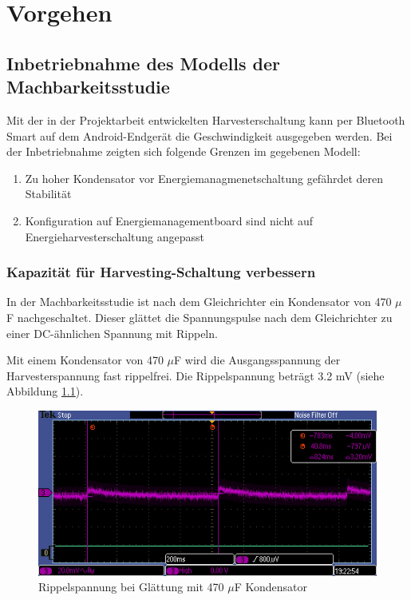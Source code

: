 \chapter{Vorgehen}

\section{Inbetriebnahme des Modells der Machbarkeitsstudie}
Mit der in der Projektarbeit entwickelten Harvesterschaltung kann per Bluetooth Smart auf dem Android-Endgerät die Geschwindigkeit ausgegeben werden.
Bei der Inbetriebnahme zeigten sich folgende Grenzen im gegebenen Modell:

\begin{enumerate}
    \item Zu hoher Kondensator vor Energiemanagmenetschaltung gefährdet deren Stabilität
    \item Konfiguration auf Energiemanagementboard sind nicht auf Energieharvesterschaltung angepasst
\end{enumerate}


\subsection{Kapazität für Harvesting-Schaltung verbessern}

In der Machbarkeitsstudie ist nach dem Gleichrichter ein Kondensator von 470 $\mu$F nachgeschaltet. Dieser glättet die Spannungspulse nach dem Gleichrichter zu einer DC-ähnlichen Spannung mit Rippeln.

Mit einem Kondensator von 470 $\mu$F wird die Ausgangsspannung der Harvesterspannung fast rippelfrei. Die Rippelspannung beträgt 3.2 mV (siehe Abbildung \ref{kond470uF}).

\begin{figure}
    \includegraphics[width=15cm]{3Vorgehen/imag/470uF.PNG}
    \caption{Rippelspannung bei Glättung mit 470 $\mu$F Kondensator}\label{kond470uF} 
\end{figure}

